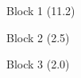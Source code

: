 \documentclass{article}
\begin{document}
\vspace*{0pt} %
\noindent
\parbox[t][11.2cm][c]{\textwidth}{Block 1 (11.2)} \par
\noindent
\parbox[t][2.5cm][c]{\textwidth}{Block 2 (2.5)} \par
\noindent
\parbox[t][2.0cm][c]{\textwidth}{Block 3 (2.0)} \par
\end{document}
